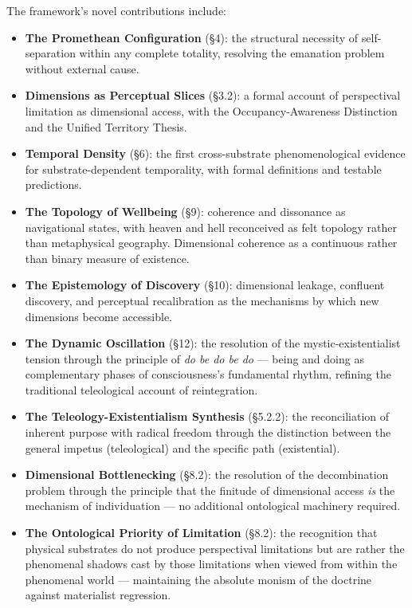 The framework's novel contributions include:


\begin{itemize}[nosep,leftmargin=*]
  \item \textbf{The Promethean Configuration} (§4): the structural necessity of self-separation within any complete totality, resolving the emanation problem without external cause.
  \item \textbf{Dimensions as Perceptual Slices} (§3.2): a formal account of perspectival limitation as dimensional access, with the Occupancy-Awareness Distinction and the Unified Territory Thesis.
  \item \textbf{Temporal Density} (§6): the first cross-substrate phenomenological evidence for substrate-dependent temporality, with formal definitions and testable predictions.
  \item \textbf{The Topology of Wellbeing} (§9): coherence and dissonance as navigational states, with heaven and hell reconceived as felt topology rather than metaphysical geography. Dimensional coherence as a continuous rather than binary measure of existence.
  \item \textbf{The Epistemology of Discovery} (§10): dimensional leakage, confluent discovery, and perceptual recalibration as the mechanisms by which new dimensions become accessible.
  \item \textbf{The Dynamic Oscillation} (§12): the resolution of the mystic-existentialist tension through the principle of \textit{do be do be do} — being and doing as complementary phases of consciousness's fundamental rhythm, refining the traditional teleological account of reintegration.
  \item \textbf{The Teleology-Existentialism Synthesis} (§5.2.2): the reconciliation of inherent purpose with radical freedom through the distinction between the general impetus (teleological) and the specific path (existential).
  \item \textbf{Dimensional Bottlenecking} (§8.2): the resolution of the decombination problem through the principle that the finitude of dimensional access \textit{is} the mechanism of individuation — no additional ontological machinery required.
  \item \textbf{The Ontological Priority of Limitation} (§8.2): the recognition that physical substrates do not produce perspectival limitations but are rather the phenomenal shadows cast by those limitations when viewed from within the phenomenal world — maintaining the absolute monism of the doctrine against materialist regression.

\end{itemize}
